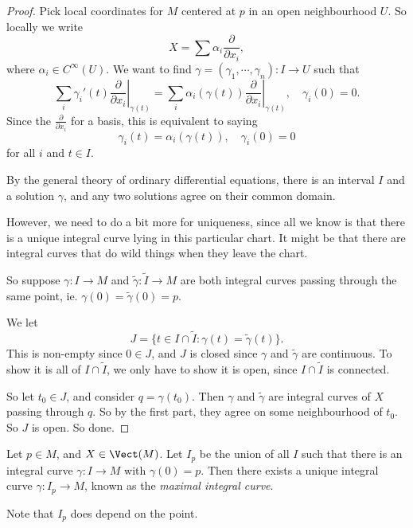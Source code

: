 \documentclass[a4paper]{article}
\begin{document}
\begin{proof}
  Pick local coordinates for $M$ centered at $p$ in an open neighbourhood $U$. So locally we write
  \[
    X = \sum \alpha_i \frac{\partial}{\partial x_i},
  \]
  where $\alpha_i \in C^\infty(U)$. We want to find $\gamma = (\gamma_1, \cdots, \gamma_n): I \to U$ such that
  \[
    \sum_i \gamma_i'(t) \left.\frac{\partial}{\partial x_i}\right|_{\gamma(t)} = \sum_i \alpha_i(\gamma(t)) \left.\frac{\partial}{\partial x_i}\right|_{\gamma(t)},\quad \gamma_i(0) = 0.
  \]
  Since the $\frac{\partial}{\partial x_i}$ for a basis, this is equivalent to saying
  \[
    \gamma_i(t) = \alpha_i(\gamma(t)),\quad \gamma_i(0) = 0
  \]
  for all $i$ and $t \in I$.

  By the general theory of ordinary differential equations, there is an interval $I$ and a solution $\gamma$, and any two solutions agree on their common domain.

  However, we need to do a bit more for uniqueness, since all we know is that there is a unique integral curve lying in this particular chart. It might be that there are integral curves that do wild things when they leave the chart.

  So suppose $\gamma: I \to M$ and $\tilde{\gamma}: \tilde{I} \to M$ are both integral curves passing through the same point, ie. $\gamma(0) = \tilde{\gamma}(0) = p$.

  We let
  \[
    J = \{t \in I \cap \tilde{I}: \gamma(t) = \tilde{\gamma}(t)\}.
  \]
  This is non-empty since $0 \in J$, and $J$ is closed since $\gamma$ and $\tilde{\gamma}$ are continuous. To show it is all of $I \cap \tilde{I}$, we only have to show it is open, since $I \cap \tilde{I}$ is connected.

  So let $t_0 \in J$, and consider $q = \gamma(t_0)$. Then $\gamma$ and $\tilde{\gamma}$ are integral curves of $X$ passing through $q$. So by the first part, they agree on some neighbourhood of $t_0$. So $J$ is open. So done.
\end{proof}

\begin{defi}
  Let $p \in M$, and $X \in \Vect(M)$. Let $I_p$ be the union of all $I$ such that there is an integral curve $\gamma: I \to M$ with $\gamma(0) = p$. Then there exists a unique integral curve $\gamma: I_p \to M$, known as the \emph{maximal integral curve}.
\end{defi}

Note that $I_p$ does depend on the point.
\end{document}
